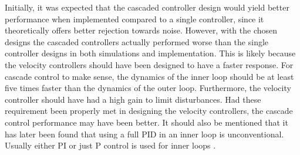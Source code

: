 \documentclass[../../main.tex]{subfiles}
\begin{document}
Initially, it was expected that the cascaded controller design would yield better performance when implemented compared to a single controller, since it theoretically offers better rejection towards noise. However, with the chosen designs the cascaded controllers actually performed worse than the single controller designs in both simulations and implementation. This is likely because the velocity controllers should have been designed to have a faster response. For cascade control to make sense, the dynamics of the inner loop should be at least five times faster than the dynamics of the outer loop. Furthermore, the velocity controller should have had a high gain to limit disturbances. Had these requirement been properly met in designing the velocity controllers, the cascade control performance may have been better. It should also be mentioned that it has later been found that using a full PID in an inner loop is unconventional. Usually either PI or just P control is used for inner loops \cite{}.
\end{document}
